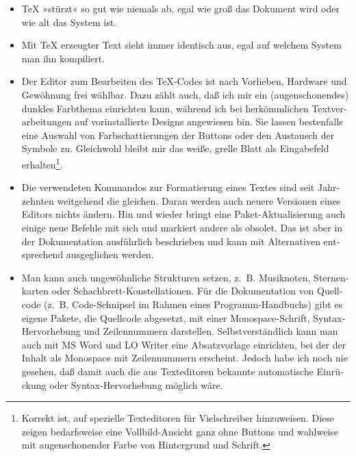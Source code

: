\documentclass[11pt,a4paper,ngerman,french,DIV=8]{scrartcl}
\begin{document}
\begin{otherlanguage}{ngerman}
\begin{itemize}
\begin{itemize}
    \item Die Nutzung des \texttt{csquotes}-Pakets vorausgesetzt, werden Anführungszeichen nicht mehr manuell eingegeben, sondern das Wort wird mit einem Befehl eingeklammert. Nur am Dokumentanfang wird definiert, welche Form von Anführungszeichen verwendet werden sollen (deutsch/englisch, einfach/doppelt etc.). Beim Kompilieren werden diese nach Vorgabe gesetzt, und können ebenso einfach, dokumentweit!, ausgetauscht werden. Durch die Einklammerung ist außerdem ausgeschlossen, daß man versehentlich nur das eine Anführungszeichen setzt und das zweite vergißt.
    \item Literaturverwaltung zusammen mit Bib\TeX{} bzw. Bib\LaTeX{}: Literatur in einer Datenbank, eindeutige Schlüssel werden im Quellcode zitiert; verwaiste Zitate im Mengentext oder überflüssige Einträge im Literaturverzeichnis sind gar nicht möglich! Korrekte Sortierung der Einträge und einheitliche Formatierung werden durch Automatismen und einen ausgewählten, eindeutigen Zitierstil übernommen.
  \end{itemize}
  \item \TeX{} »stürzt« so gut wie niemals ab, egal wie groß das Dokument wird oder wie alt das System ist.
  \item Mit \TeX{} erzeugter Text sieht immer identisch aus, egal auf welchem System man ihn kompiliert.
  \item Der Editor zum Bearbeiten des \TeX{}-Codes ist nach Vorlieben, Hardware und Gewöhnung frei wählbar. Dazu zählt auch, daß ich mir ein (augenschonendes) dunkles Farbthema einrichten kann, während ich bei herkömmlichen Textverarbeitungen auf vorinstallierte Designs angewiesen bin. Sie lassen bestenfalls eine Auswahl von Farbschattierungen der Buttons oder den Austausch der Symbole zu. Gleichwohl bleibt mir das weiße, grelle Blatt als Eingabefeld erhalten\footnote{Korrekt ist, auf spezielle Texteditoren für Vielschreiber hinzuweisen. Diese zeigen bedarfsweise eine Vollbild-Ansicht ganz ohne Buttons und wahlweise mit augenschonender Farbe von Hintergrund und Schrift.}.
  \item Die verwendeten Kommandos zur Formatierung eines Textes sind seit Jahrzehnten weitgehend die gleichen. Daran werden auch neuere Versionen eines Editors nichts ändern. Hin und wieder bringt eine Paket-Aktualisierung auch einige neue Befehle mit sich und markiert andere als obsolet. Das ist aber in der Dokumentation ausführlich beschrieben und kann mit Alternativen entsprechend ausgeglichen werden.
  \item Man kann auch ungewöhnliche Strukturen setzen, z.~B. Musiknoten, Sternenkarten oder Schachbrett-Konstellationen. Für die Dokumentation von Quellcode (z.~B. Code-Schnipsel im Rahmen eines Programm-Handbuchs) gibt es eigene Pakete, die Quellcode abgesetzt, mit einer Monospace-Schrift, Syntax-Hervorhebung und Zeilennummern darstellen. Selbstverständlich kann man auch mit MS Word und LO Writer eine Absatzvorlage einrichten, bei der der Inhalt als Monospace mit Zeilennummern erscheint. Jedoch habe ich noch nie gesehen, daß damit auch die aus Texteditoren bekannte automatische Einrückung oder Syntax-Hervorhebung möglich wäre.

\end{itemize}
\end{otherlanguage}
\end{document}
